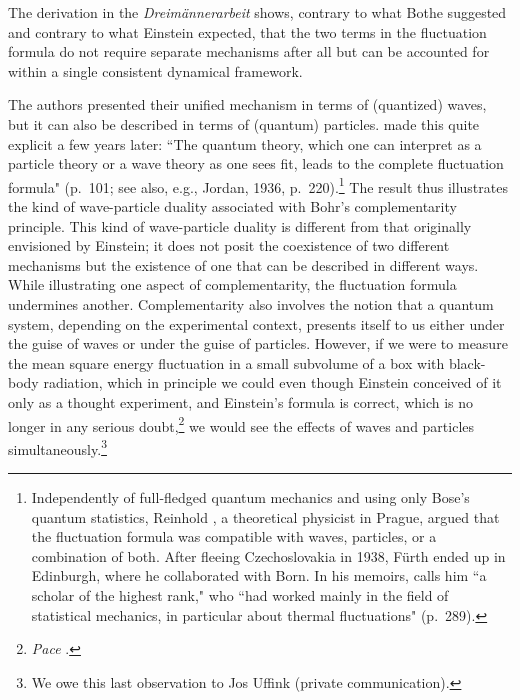 \documentclass[12pt]{elsart}
\begin{document}
The derivation in the {\it Dreim\"annerarbeit} shows, contrary to what Bothe suggested and contrary to what Einstein expected, that the two terms in the fluctuation formula do not require separate mechanisms after all but can be accounted for within a single consistent dynamical framework. 

The authors presented their unified mechanism in terms of (quantized) waves, but it can also be described in terms of (quantum) particles. \citet{Heisenberg 1930} made this quite explicit a few years later:  ``The quantum theory, which one can interpret as a particle theory or a wave theory as one sees fit, leads to the complete fluctuation formula" (p.\ 101; see also, e.g., Jordan, 1936, p.\ 220).\footnote{\label{fuerth}Independently of full-fledged quantum mechanics and using only Bose's quantum statistics, Reinhold \citet[p.\ 312]{Fuerth 1928}, a theoretical physicist in Prague, argued that the fluctuation formula was compatible with waves, particles, or a combination of both. After fleeing Czechoslovakia in 1938, F\"urth ended up in Edinburgh, where he collaborated with Born. In his memoirs, \citet{Born 1978} calls him ``a scholar of the highest rank," who ``had worked mainly in the field of statistical mechanics, in particular about thermal fluctuations" (p.\ 289).} The result thus illustrates the kind of wave-particle duality associated with Bohr's complementarity principle. This kind of wave-particle duality is different from that originally envisioned by Einstein; it does not posit the coexistence of two different mechanisms but the existence of one that can be described in different ways. While illustrating one aspect of complementarity, the fluctuation formula undermines another.  Complementarity also involves the notion that  a quantum system, depending on the experimental context,  presents itself to us either under the guise of waves or under the guise of particles. However, if we were to measure the mean square energy fluctuation in a small subvolume of a box with black-body radiation, which in principle we could even though Einstein conceived of it only as a thought experiment, and Einstein's formula is correct, which is no longer in any serious doubt,\footnote{{\it Pace} \citep{Gonzalez and Wergeland 1973}.} we would see the effects of waves and particles 
simultaneously.\footnote{We owe this last observation to Jos Uffink (private communication).}   
\end{document}
